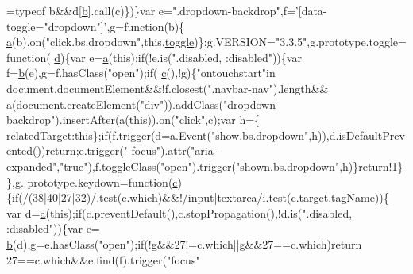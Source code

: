 \begin{DoxyCode}
      =typeof b&&d[\hyperlink{bootstrap_8min_8js_ac0431efac4d7c393d1e70b86115cb93f}{b}].call(c)\})\}var e=\textcolor{stringliteral}{".dropdown-backdrop"},f=\textcolor{stringliteral}{'[data-toggle="dropdown"]'},g=\textcolor{keyword}{function}(b)\{
      \hyperlink{bootstrap_8min_8js_ae8f6b400ed3390908c5cdeebed3a82b9}{a}(b).on(\textcolor{stringliteral}{"click.bs.dropdown"},this.\hyperlink{bootstrap_8min_8js_aa8e797a9bda5e7e313be3518054164a3}{toggle})\};g.VERSION=\textcolor{stringliteral}{"3.3.5"},g.prototype.toggle=\textcolor{keyword}{function}(
      \hyperlink{bootstrap_8min_8js_aeb337d295abaddb5ec3cb34cc2e2bbc9}{d})\{var e=\hyperlink{bootstrap_8min_8js_ae8f6b400ed3390908c5cdeebed3a82b9}{a}(\textcolor{keyword}{this});\textcolor{keywordflow}{if}(!e.is(\textcolor{stringliteral}{".disabled, :disabled"}))\{var f=\hyperlink{bootstrap_8min_8js_ac0431efac4d7c393d1e70b86115cb93f}{b}(e),g=f.hasClass(\textcolor{stringliteral}{"open"});\textcolor{keywordflow}{if}(
      \hyperlink{bootstrap_8min_8js_ad9d1ac02e33c4aed62ad517a7cb8b3fb}{c}(),!g)\{\textcolor{stringliteral}{"ontouchstart"}in document.documentElement&&!f.closest(\textcolor{stringliteral}{".navbar-nav"}).length&&
      \hyperlink{bootstrap_8min_8js_ae8f6b400ed3390908c5cdeebed3a82b9}{a}(document.createElement(\textcolor{stringliteral}{"div"})).addClass(\textcolor{stringliteral}{"dropdown-backdrop"}).insertAfter(\hyperlink{bootstrap_8min_8js_ae8f6b400ed3390908c5cdeebed3a82b9}{a}(\textcolor{keyword}{this})).on(\textcolor{stringliteral}{"click"},c);var h=\{
      relatedTarget:\textcolor{keyword}{this}\};\textcolor{keywordflow}{if}(f.trigger(d=a.Event(\textcolor{stringliteral}{"show.bs.dropdown"},h)),d.isDefaultPrevented())\textcolor{keywordflow}{return};e.trigger(\textcolor{stringliteral}{"
      focus"}).attr(\textcolor{stringliteral}{"aria-expanded"},\textcolor{stringliteral}{"true"}),f.toggleClass(\textcolor{stringliteral}{"open"}).trigger(\textcolor{stringliteral}{"shown.bs.dropdown"},h)\}\textcolor{keywordflow}{return}!1\}\},g.
      prototype.keydown=\textcolor{keyword}{function}(\hyperlink{bootstrap_8min_8js_ad9d1ac02e33c4aed62ad517a7cb8b3fb}{c})\{\textcolor{keywordflow}{if}(/(38|40|27|32)/.test(c.which)&&!/\hyperlink{namespaceinput}{input}|textarea/i.test(c.target.tagName))\{
      var d=\hyperlink{bootstrap_8min_8js_ae8f6b400ed3390908c5cdeebed3a82b9}{a}(\textcolor{keyword}{this});\textcolor{keywordflow}{if}(c.preventDefault(),c.stopPropagation(),!d.is(\textcolor{stringliteral}{".disabled, :disabled"}))\{var e=
      \hyperlink{bootstrap_8min_8js_ac0431efac4d7c393d1e70b86115cb93f}{b}(d),g=e.hasClass(\textcolor{stringliteral}{"open"});\textcolor{keywordflow}{if}(!g&&27!=c.which||g&&27==c.which)\textcolor{keywordflow}{return} 27==c.which&&e.find(f).trigger(\textcolor{stringliteral}{"focus"}

\end{DoxyCode}
